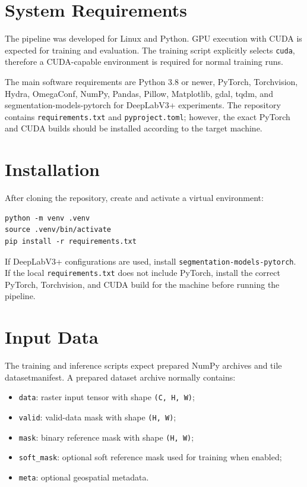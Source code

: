 \begin{sloppypar}
\section{System Requirements}

The pipeline was developed for Linux and Python. GPU execution with CUDA is expected for training and evaluation. The training script explicitly selects \texttt{cuda}, therefore a CUDA-capable environment is required for normal training runs.

The main software requirements are Python 3.8 or newer, PyTorch, Torchvision, Hydra, OmegaConf, NumPy, Pandas, Pillow, Matplotlib, \gls{gdal}, tqdm, and segmentation-models-pytorch for DeepLabV3+ experiments. The repository contains \texttt{requirements.txt} and \texttt{pyproject.toml}; however, the exact PyTorch and CUDA builds should be installed according to the target machine.

\section{Installation}

After cloning the repository, create and activate a virtual environment:

\begin{verbatim}
python -m venv .venv
source .venv/bin/activate
pip install -r requirements.txt
\end{verbatim}

If DeepLabV3+ configurations are used, install \texttt{segmentation-models-pytorch}. If the local \texttt{requirements.txt} does not include PyTorch, install the correct PyTorch, Torchvision, and CUDA build for the machine before running the pipeline.

\section{Input Data}

The training and inference scripts expect prepared NumPy archives and tile \gls{datasetmanifest}. A prepared dataset archive normally contains:

\begin{itemize}
    \item \texttt{data}: raster input tensor with shape \texttt{(C, H, W)};
    \item \texttt{valid}: valid-data mask with shape \texttt{(H, W)};
    \item \texttt{mask}: binary reference mask with shape \texttt{(H, W)};
    \item \texttt{soft\_mask}: optional soft reference mask used for training when enabled;
    \item \texttt{meta}: optional geospatial metadata.
\end{itemize}


\end{sloppypar}
